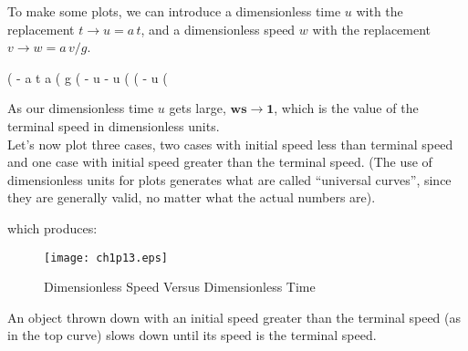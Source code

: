 \documentclass[11pt]{article}
\begin{document}
\noindent To make some plots, we can introduce a dimensionless time $u$ with the
  replacement $t \rightarrow u = a\,t$, and a dimensionless speed $w$ with the
  replacement $v \rightarrow w = a\,v/g$.
\begin{myVerbatim}
(%
                             - a t
                         a %
(%
                              g
(%
                              - u        - u
(%
(%
                                - u
(%
\end{myVerbatim}
As our dimensionless time $u$ gets large, $\mathbf{ws \rightarrow 1}$, which is the value of the
  terminal speed in dimensionless units.\\
  
\noindent Let's now plot three cases, two cases with initial speed less than terminal speed
  and one case with initial speed greater than the terminal speed.
(The use of dimensionless units for plots generates what are called ``universal curves'', since
  they are generally valid, no matter what the actual numbers are).
\noindent which produces:
\smallskip
\begin{figure} [h]  
   \centerline{\texttt{[image: ch1p13.eps]} }
	\caption{Dimensionless Speed Versus Dimensionless Time }
\end{figure}

\newpage
\noindent An object thrown down with an initial speed greater than the terminal
  speed (as in the top curve) slows down until its speed is the terminal speed.\\
  
\end{document}
